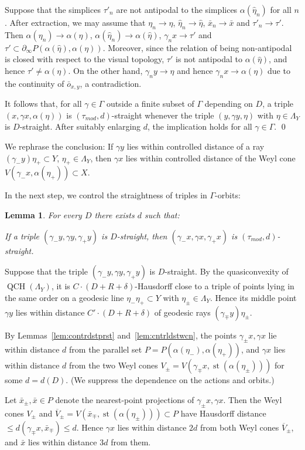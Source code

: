 \documentclass[12pt]{article}
\theoremstyle{boldplain}
\newtheorem{lem}[equation]{Lemma}
\theoremstyle{bolddefinition}
\numberwithin{equation}{section}
\def\al{\alpha}
\def\ga{\gamma}
\def\Ga{\Gamma}
\def\de{\delta}
\def\QCH{\operatorname{QCH}}
\def\geo{\partial_{\infty}}
\def\LaY{\Lambda_Y}
\def\ol{\overline}
\def\st{\operatorname{st}}
\def\taumod{\tau_{mod}}
\begin{document}
Suppose that the simplices $\tau'_n$ are not antipodal to the simplices $\al(\hat\eta_n)$ for all $n$.
After extraction, we may assume that $\eta_n\to\eta$, $\hat\eta_n\to\hat\eta$, $\bar x_n\to\bar x$ and $\tau'_n\to\tau'$.
Then $\al(\eta_n)\to\al(\eta)$, $\al(\hat\eta_n)\to\al(\hat\eta)$, $\ga_n x\to\tau'$
and $\tau'\subset\geo P(\al(\hat\eta),\al(\eta))$.
Moreover, since the relation of being non-antipodal is closed with respect to the visual topology,
$\tau'$ is not antipodal to $\al(\hat\eta)$,
and hence $\tau'\neq\al(\eta)$.
On the other hand, $\ga_ny\to\eta$ and hence $\ga_nx\to\al(\eta)$
due to the continuity of $\bar o_{x,y}$, 
a contradiction. 

It follows that, for all $\ga\in\Ga$ outside a finite subset of $\Ga$ depending on $D$,
a triple $(x,\ga x,\al(\eta))$ is $(\taumod,d)$-straight
whenever the triple $(y,\ga y,\eta)$ with $\eta\in\LaY$ is $D$-straight.
After suitably enlarging $d$,
the implication holds for all $\ga\in\Ga$.
\qed 

\medskip
We rephrase the conclusion:
If $\ga y$ lies within controlled distance of a ray $(\ga_-y)\eta_+\subset Y$, $\eta_+\in\LaY$,
then $\ga x$ lies within controlled distance of the Weyl cone $V(\ga_-x,\al(\eta_+))\subset X$.

In the next step,
we control the straightness of triples in $\Ga$-orbits:
\begin{lem}
\label{lem:rbdstrghtn}
For every $D$ there exists $d$ such that: 

If a triple $(\ga_-y,\ga y,\ga_+y)$ is $D$-straight, 
then $(\ga_-x,\ga x,\ga_+x)$ is $(\taumod,d)$-straight.
\end{lem}
\proof 
Suppose that the triple $(\ga_-y,\ga y,\ga_+y)$ is $D$-straight. 
By the quasiconvexity of $\QCH(\LaY)$,
it is $C\cdot (D+R+\de)$-Hausdorff close 
to a triple of points lying in the same order on a
geodesic line $\eta_-\eta_+\subset Y$ with $\eta_\pm\in\LaY$. 
Hence its middle point $\ga y$ lies within distance $C'\cdot (D+R+\de)$ of geodesic rays $(\ga_{\mp}y)\eta_{\pm}$.

By Lemmas~\ref{lem:contrdstprst} and~\ref{lem:cntrldstwcn}, 
the points $\ga_{\pm}x,\ga x$ lie within 
distance $d$ 
from the parallel set $P=P(\al(\eta_-), \al(\eta_+))$,
and 
$\ga x$ lies within 
distance $d$ 
from the two Weyl cones $V_{\pm}=V(\ga_{\mp}x,\st(\al(\eta_{\pm})))$ for some $d=d(D)$.
(We suppress the dependence on the actions and orbits.)

Let $\bar x_{\pm},\bar x\in P$ denote the nearest-point projections of $\ga_{\pm} x,\ga x$.
Then the Weyl cones $V_{\pm}$
and $\ol V_{\pm}=V(\bar x_{\mp},\st(\al(\eta_{\pm})))\subset P$
have Hausdorff distance $\leq d(\ga_{\mp}x,\bar x_{\mp})\leq d$. 
Hence $\ga x$ lies within distance $2d$ 
from both Weyl cones 
$\ol V_{\pm}$, 
and $\bar x$ lies within distance $3d$ from them. 
\end{document}
